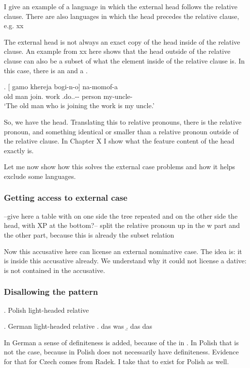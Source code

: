 I give an example of a language in which the external head follows the relative clause. There are also languages in which the head precedes the relative clause, e.g. xx

The external head is not always an exact copy of the head inside of the relative clause. An example from xx here shows that the head outside of the relative clause can also be a subset of what the element inside of the relative clause is. In this case, there is an  and a .

\exg. [ gamo khereja bogi-n-o]  na-momof-a\\
 {old man} join. work .do..-- person my-uncle-\\
 `The old man who is joining the work is my uncle.'

So, we have the head. Translating this to relative pronouns, there is the relative pronoun, and something identical or smaller than a relative pronoun outside of the relative clause. In Chapter X I show what the feature content of the head exactly is.

Let me now show how this solves the external case problems and how it helps exclude some languages.


\subsubsection{Getting access to external case}

--give here a table with on one side the tree repeated and on the other side the head, with XP at the bottom?--
split the relative pronoun up in the w part and the other part, because this is already the subset relation

Now this accusative here can license an external nominative case. The idea is: it is inside this accusative already. We understand why it could not license a dative:  is not contained in the accusative.


\subsubsection{Disallowing the pattern}

\ex. Polish light-headed relative

\ex. German light-headed relative
\a. das was
\b. das das

In German a sense of definiteness is added, because of the  in . In Polish that is not the case, because  in Polish does not necessarily have definiteness. Evidence for that for Czech comes from Radek. I take that to exist for Polish as well.


